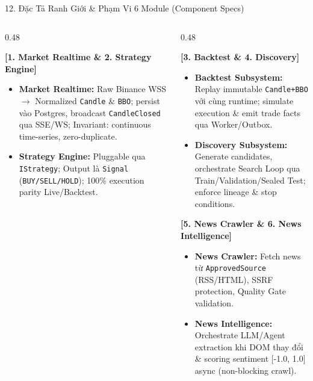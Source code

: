 \documentclass[aspectratio=169,10pt]{beamer}
\begin{document}
\begin{frame}{12. Đặc Tả Ranh Giới \& Phạm Vi 6 Module (Component Specs)}
\begin{columns}[T]
\begin{column}{0.48\textwidth}
\begin{block}{\textbf{[1. Market Realtime \& 2. Strategy Engine]}}
\begin{itemize}
  \item \textbf{Market Realtime:} Raw Binance WSS $\rightarrow$ Normalized \texttt{Candle} \& \texttt{BBO}; persist vào Postgres, broadcast \texttt{CandleClosed} qua SSE/WS; Invariant: continuous time-series, zero-duplicate.
  \item \textbf{Strategy Engine:} Pluggable qua \texttt{IStrategy}; Output là \texttt{Signal} (\texttt{BUY/SELL/HOLD}); 100\% execution parity Live/Backtest.
\end{itemize}
\end{block}
\end{column}
\begin{column}{0.48\textwidth}
\begin{block}{\textbf{[3. Backtest \& 4. Discovery]}}
\begin{itemize}
  \item \textbf{Backtest Subsystem:} Replay immutable \texttt{Candle+BBO} với cùng runtime; simulate execution \& emit trade facts qua Worker/Outbox.
  \item \textbf{Discovery Subsystem:} Generate candidates, orchestrate Search Loop qua Train/Validation/Sealed Test; enforce lineage \& stop conditions.
\end{itemize}
\end{block}
\vspace{0.3em}
\begin{block}{\textbf{[5. News Crawler \& 6. News Intelligence]}}
\begin{itemize}
  \item \textbf{News Crawler:} Fetch news từ \texttt{ApprovedSource} (RSS/HTML), SSRF protection, Quality Gate validation.
  \item \textbf{News Intelligence:} Orchestrate LLM/Agent extraction khi DOM thay đổi \& scoring sentiment [-1.0, 1.0] async (non-blocking crawl).
\end{itemize}
\end{block}
\end{column}
\end{columns}
\end{frame}
\end{document}
